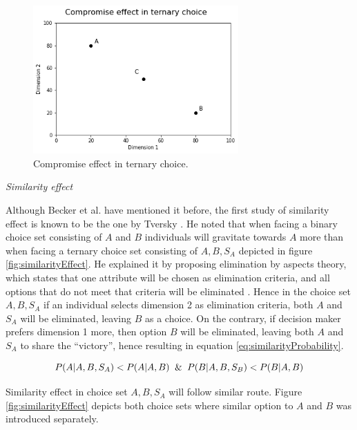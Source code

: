 \documentclass[a4paper,12pt]{article}
\newcommand{\citeyearonly}[1]{\citeyearpar{#1}}
\begin{document}
\begin{figure}[h]
    \centering
    \includegraphics[width=0.7\textwidth]{staticFiles/compromiseEffect.png}
    \caption{Compromise effect in ternary choice.} %
    \label{fig:compromiseEffect} %

\end{figure}

\textit{Similarity effect}

Although Becker et al. \citeyearonly{becker1964measuring} have mentioned it before, the first study of similarity effect is known to be the one by Tversky \citep{tversky1972elimination}. He noted that when facing a binary choice set consisting of $A$ and $B$ individuals will gravitate towards $A$ more than when facing a ternary choice set consisting of ${A, B, S_A}$ depicted in figure \ref{fig:similarityEffect}. He explained it by proposing elimination by aspects theory, which states that one attribute will be chosen as elimination criteria, and all options that do not meet that criteria will be eliminated \citep{tversky1972elimination}. Hence in the choice set ${A, B, S_A}$ if an individual selects dimension 2 as elimination criteria, both $A$ and $S_A$ will be eliminated, leaving $B$ as a choice. On the contrary, if decision maker prefers dimension 1 more, then option 
$B$ will be eliminated, leaving both $A$ and $S_A$ to share the ``victory'', hence resulting in equation \ref{eq:similarityProbability}.

\begin{equation}\label{eq:similarityProbability}
    P(A|A,B,S_A) < P(A|A,B) \And  P(B|A,B,S_B) < P(B|A,B)
\end{equation}

Similarity effect in choice set ${A, B, S_A}$ will follow similar route. Figure \ref{fig:similarityEffect} depicts both choice sets where similar option to $A$ and $B$ was introduced separately.
\end{document}

